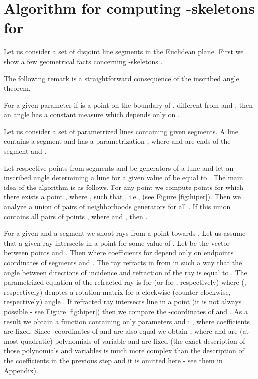 \documentclass[11pt]{llncs}
\begin{document}
\section{Algorithm for computing -skeletons for }

Let us consider a set  of  disjoint line segments in the Euclidean plane. 
First we show a few geometrical facts concerning -skeletons 
.



The following remark is a straightforward consequence of the inscribed angle theorem. 

\begin{remark}
\label{lematkat}
For a given parameter  if  is a point on the boundary of  
, different from  and , then an angle  
has a constant measure which depends only on .
\end{remark}





Let us consider a set of parametrized lines containing given segments. 
A line  contains a segment  and has a parametrization 
, 
where  and  are ends of the segment  
and . 

  Let respective points from segments  and  be generators of a lune and let  
an inscribed angle determining a lune for a given value of  be equal to .
The main idea of the algorithm is as follows.
For any point  we compute points  for which 
there exists a point , where ,
such that 
, i.e., 
(see Figure \ref{fig:hiper}).  
Then we analyze a union of pairs of neighborhoods generators for all . 
If this union contains all pairs of points , where  and ,
then .

For a given  and a segment 
we shoot rays from a point  towards .
Let us assume that a given ray intersects  in a point 
  for some value of . 
Let  be the vector between points  and . 
Then  where coefficients  for  
depend only on endpoints coordinates of segments  and .
The ray refracts in  from  in such a way that the angle between
directions of incidence and refraction of the ray is equal to . 
The parametrized equation of the refracted ray is 
 for  
(or  for , respectively) 
where  (, respectively) denotes a rotation matrix 
for a clockwise (counter-clockwise, respectively) angle . 
If refracted ray  intersects line  in a point  
(it is not always possible - see Figure \ref{fig:hiper}) then we compare the 
-coordinates of  and . 
As a result we obtain a function containing only parameters  and :  
, 
where coefficients  are fixed.
Since -coordinates of  and  are also equal we obtain 
, 
where  and  are (at most quadratic) polynomials of variable 
 and  are fixed (the exact description of those polynomials and variables
is much more complex than the description of the coefficients in the previous step and it is omitted here 
- see them in Appendix).
 
\end{document}
